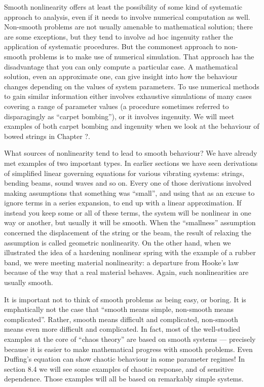   Smooth nonlinearity offers at least the possibility of some kind of 
  systematic approach to analysis, even if it needs to involve numerical 
  computation as well. Non-smooth problems are not usually amenable to 
  mathematical solution; there are some exceptions, but they tend to involve ad 
  hoc ingenuity rather the application of systematic procedures. But the 
  commonest approach to non-smooth problems is to make use of numerical 
  simulation. That approach has the disadvantage that you can only compute a 
  particular case. A mathematical solution, even an approximate one, can give 
  insight into how the behaviour changes depending on the values of system 
  parameters. To use numerical methods to gain similar information either 
  involves exhaustive simulations of many cases covering a range of parameter 
  values (a procedure sometimes referred to disparagingly as “carpet bombing”), 
  or it involves ingenuity. We will meet examples of both carpet bombing and 
  ingenuity when we look at the behaviour of bowed strings in Chapter ?. 

  What sources of nonlinearity tend to lead to smooth behaviour? We have 
  already met examples of two important types. In earlier sections we have seen 
  derivations of simplified linear governing equations for various vibrating 
  systems: strings, bending beams, sound waves and so on. Every one of those 
  derivations involved making assumptions that something was “small”, and using 
  that as an excuse to ignore terms in a series expansion, to end up with a 
  linear approximation. If instead you keep some or all of these terms, the 
  system will be nonlinear in one way or another, but usually it will be 
  smooth. When the ``smallness'' assumption concerned the displacement of the 
  string or the beam, the result of relaxing the assumption is called geometric 
  nonlinearity. On the other hand, when we illustrated the idea of a hardening 
  nonlinear spring with the example of a rubber band, we were meeting material 
  nonlinearity: a departure from Hooke's law because of the way that a real 
  material behaves. Again, such nonlinearities are usually smooth. 

  It is important not to think of smooth problems as being easy, or boring. It 
  is emphatically not the case that ``smooth means simple, non-smooth means 
  complicated''. Rather, smooth means difficult and complicated, non-smooth 
  means even more difficult and complicated. In fact, most of the well-studied 
  examples at the core of ``chaos theory'' are based on smooth systems — 
  precisely because it is easier to make mathematical progress with smooth 
  problems. Even Duffing's equation can show chaotic behaviour in some 
  parameter regimes! In section 8.4 we will see some examples of chaotic 
  response, and of sensitive dependence. Those examples will all be based on 
  remarkably simple systems. 

